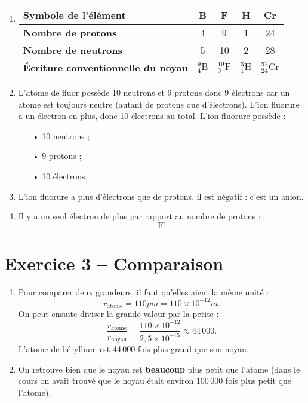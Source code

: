 \documentclass[12pt,a4paper]{article}
\renewcommand\arraystretch{1.25}		%
\begin{document}
\begin{enumerate}
\item

\begin{center}
\renewcommand\arraystretch{1}		%
\begin{tabular}{|l|c|c|c|c|}
\hline
\textbf{Symbole de l'élément}	& \quad{} B \quad{} & \quad{} F \quad{} & \quad{} H \quad{} & \quad{} Cr \quad{} \\
\hline
\textbf{Nombre de protons}		& 4 & 9 & 1 & 24 \\
\hline
\textbf{Nombre de neutrons}	& 5 & 10 & 2 & 28 \\
\hline
\textbf{Écriture conventionnelle du noyau} & $^{9}_{4}\text{B}$ & $^{19}_{9}\text{F}$ & $^{3}_{1}\text{H}$ & $^{52}_{24}\text{Cr}$ \\
\hline
\end{tabular}
\renewcommand\arraystretch{1.5}		%
\end{center}

\item L'atome de fluor possède 10 neutrons et 9 protons donc 9 électrons car un atome est toujours neutre (autant de protons que d'électrons).
L'ion fluorure a un électron en plus, donc 10 électrons au total.
L'ion fluorure possède :
\begin{itemize}
\item[•] 10 neutrons ;
\item[•] 9 protons ;
\item[•] 10 électrons.
\end{itemize}

\item L'ion fluorure a plus d'électrons que de protons, il est négatif : c'est un anion.

\item Il y a un seul électron de plus par rapport au nombre de protons :
\[\text{F}^\text{-}\]
\end{enumerate}

\section*{Exercice 3 -- Comparaison}

\begin{enumerate}
\item Pour comparer deux grandeurs, il faut qu'elles aient la même unité :
\[
r_\mathrm{atome} = \unit{110}{pm} = \unit{110\times 10^{-12}}{m}.
\]
On peut ensuite diviser la grande valeur par la petite :
\[
\frac{r_\mathrm{atome}}{r_\mathrm{noyau}} = \frac{110\times 10^{-12}}{2{,}5\times 10^{-15}} \approx 44\,000.
\]
L'atome de béryllium est 44\,000 fois plus grand que son noyau.

\item On retrouve bien que le noyau est \textbf{beaucoup} plus petit que l'atome (dans le cours on avait trouvé que le noyau était environ 100\,000 fois plus petit que l'atome).

\end{enumerate}
\end{document}
